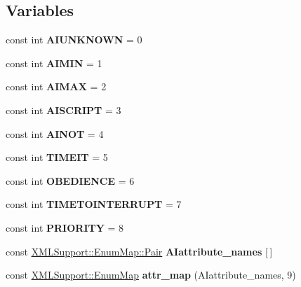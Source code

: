 \subsection*{Variables}
\begin{DoxyCompactItemize}
\item 
const int {\bfseries A\+I\+U\+N\+K\+N\+O\+WN} = 0\hypertarget{namespaceAIEvents_aa18e9f19a00c8e5349afd46345f0d8b3}{}\label{namespaceAIEvents_aa18e9f19a00c8e5349afd46345f0d8b3}

\item 
const int {\bfseries A\+I\+M\+IN} = 1\hypertarget{namespaceAIEvents_a30cd747e2af24ac18f55a20a1cffe512}{}\label{namespaceAIEvents_a30cd747e2af24ac18f55a20a1cffe512}

\item 
const int {\bfseries A\+I\+M\+AX} = 2\hypertarget{namespaceAIEvents_a9d10fd91d32808d4fddd0de471b7c82a}{}\label{namespaceAIEvents_a9d10fd91d32808d4fddd0de471b7c82a}

\item 
const int {\bfseries A\+I\+S\+C\+R\+I\+PT} = 3\hypertarget{namespaceAIEvents_a053c46b604990deaa76d4afb5c025303}{}\label{namespaceAIEvents_a053c46b604990deaa76d4afb5c025303}

\item 
const int {\bfseries A\+I\+N\+OT} = 4\hypertarget{namespaceAIEvents_aa088167e7e6bd56b73927dc3ff28b93e}{}\label{namespaceAIEvents_aa088167e7e6bd56b73927dc3ff28b93e}

\item 
const int {\bfseries T\+I\+M\+E\+IT} = 5\hypertarget{namespaceAIEvents_a225f9031106522e7144ecb18252e7a15}{}\label{namespaceAIEvents_a225f9031106522e7144ecb18252e7a15}

\item 
const int {\bfseries O\+B\+E\+D\+I\+E\+N\+CE} = 6\hypertarget{namespaceAIEvents_a872d85a12033a8af8dbf10715762bd7a}{}\label{namespaceAIEvents_a872d85a12033a8af8dbf10715762bd7a}

\item 
const int {\bfseries T\+I\+M\+E\+T\+O\+I\+N\+T\+E\+R\+R\+U\+PT} = 7\hypertarget{namespaceAIEvents_a7eef2147d184201a3c7067571be358bb}{}\label{namespaceAIEvents_a7eef2147d184201a3c7067571be358bb}

\item 
const int {\bfseries P\+R\+I\+O\+R\+I\+TY} = 8\hypertarget{namespaceAIEvents_a28261e9fa671fc2517c2cc695e4c8d5e}{}\label{namespaceAIEvents_a28261e9fa671fc2517c2cc695e4c8d5e}

\item 
const \hyperlink{structXMLSupport_1_1EnumMap_1_1Pair}{X\+M\+L\+Support\+::\+Enum\+Map\+::\+Pair} {\bfseries A\+Iattribute\+\_\+names} \mbox{[}$\,$\mbox{]}
\item 
const \hyperlink{classXMLSupport_1_1EnumMap}{X\+M\+L\+Support\+::\+Enum\+Map} {\bfseries attr\+\_\+map} (A\+Iattribute\+\_\+names, 9)\hypertarget{namespaceAIEvents_ad2483ea87557a04acd8bd74b7931ce7b}{}\label{namespaceAIEvents_ad2483ea87557a04acd8bd74b7931ce7b}

\end{DoxyCompactItemize}


